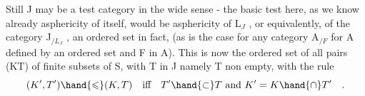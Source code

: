 Still J may be a test category in the wide sense - the basic test here,
as we know already asphericity of  itself,  would be  asphericity of L$_J$ ,
or equivalently,  of the category J$_{/L_J}$ ,  an ordered set in fact, 
(as is the case for any category A$_{/F}$ for A defined by an ordered set
and F in A\hand{\ensuremath{^{\wedge}}}).  This is now the ordered set of all pairs  (K\hand{\ensuremath{\subset}}T)  of
finite subsets of S,  with T in J namely T non empty,  with the rule
\[ (K',T') \hand{\ensuremath{\leqslant}} (K,T) \quad \text{iff} \quad T'\hand{\ensuremath{\subset}}T \ \text{and}\ K'=K\hand{\ensuremath{\cap}}T' \quad . \]
